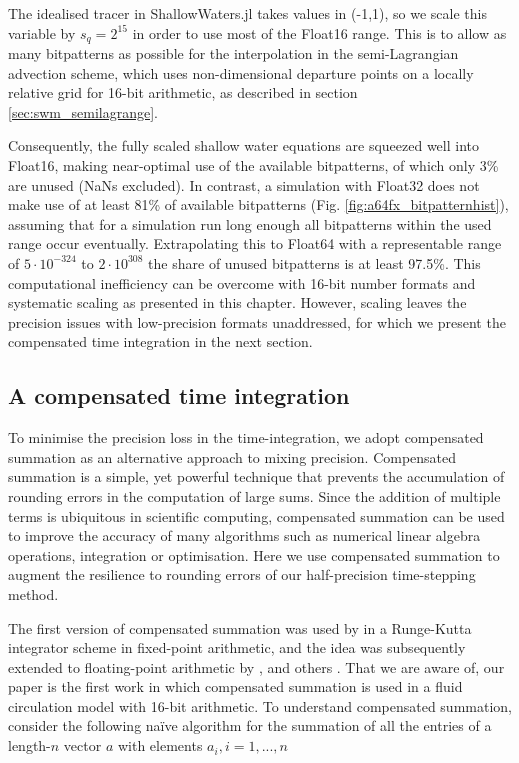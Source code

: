 The idealised tracer in ShallowWaters.jl takes values in (-1,1), so we scale this variable by $s_q = 2^{15}$
in order to use most of the Float16 range. This is to allow as many bitpatterns as possible for the interpolation
in the semi-Lagrangian advection scheme, which uses non-dimensional departure points on a locally relative
grid for 16-bit arithmetic, as described in section \ref{sec:swm_semilagrange}.

Consequently, the fully scaled shallow water equations are squeezed well into Float16, making near-optimal
use of the available bitpatterns, of which only 3\% are unused (NaNs excluded). In contrast, a simulation with
Float32 does not make use of at least 81\% of available bitpatterns (Fig. \ref{fig:a64fx_bitpatternhist}), assuming
that for a simulation run long enough all bitpatterns within the used range occur eventually. Extrapolating this
to Float64 with a representable range of $5 \cdot 10^{-324}$ to $2 \cdot 10^{308}$ the share of unused bitpatterns
is at least 97.5\%. This computational inefficiency can be overcome with 16-bit number formats and systematic
scaling as presented in this chapter. However, scaling leaves the precision issues with low-precision formats
unaddressed, for which we present the compensated time integration in the next section.

\subsection{A compensated time integration}
\label{sec:compensated_time_integration}

To minimise the precision loss in the time-integration, we adopt compensated summation as an alternative approach
to mixing precision. Compensated summation is a simple, yet powerful technique that prevents the accumulation of
rounding errors in the computation of large sums. Since the addition of multiple terms is ubiquitous in scientific computing,
compensated summation can be used to improve the accuracy of many algorithms such as numerical linear algebra
operations, integration or optimisation. Here we use compensated summation to augment the resilience to rounding
errors of our half-precision time-stepping method. 

The first version of compensated summation was used by \cite{Gill1951} in a Runge-Kutta integrator scheme in
fixed-point arithmetic, and the idea was subsequently extended to floating-point arithmetic by \cite{Kahan1965},
\cite{Moller1965} and others \citep{Vitasek1969,Linnainmaa1974,Higham1993}. That we are aware of, our paper
is the first work in which compensated summation is used in a fluid circulation model with 16-bit arithmetic.
To understand compensated summation, consider the following naïve algorithm for the summation of all the
entries of a length-$n$ vector $a$ with elements $a_i, i = 1,...,n$

